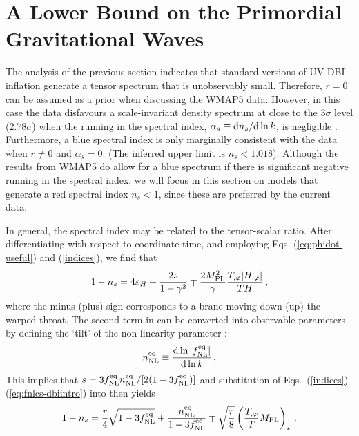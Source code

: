 \section{A Lower Bound on the Primordial Gravitational Waves} 
% 
\label{sec:lower-dbi}

The analysis of the previous section 
indicates that standard versions of UV DBI inflation generate a 
tensor spectrum that is unobservably 
small. Therefore, $r=0$ can be assumed as a prior when discussing the WMAP5
data.
However, in this case the data 
disfavours a scale-invariant density spectrum at close to the $3 \sigma$ level
($2.78\sigma$)
when the running in the spectral index, $\alpha_s \equiv \mathrm{d} n_s/\mathrm{d}\ln k$, 
is negligible \cite{Komatsu:2008hk}.  
Furthermore, a blue spectral index 
is only marginally consistent with the data when $r\ne 0$ and $\alpha_s=0$. 
(The inferred upper limit is $n_s < 1.018$).
Although the results from WMAP5 do allow for a blue spectrum if there is 
significant negative running in the spectral index, we will 
focus in this section 
on models that generate a red spectral index $n_s<1$, since these are preferred by the current
data.  


In general, the spectral index may be related to the tensor-scalar ratio. 
After differentiating  
with respect to coordinate time, and employing Eqs. (\ref{eq:phidot-useful}) 
and (\ref{indices}), we find that\footnotemark
% 
\begin{equation}
\label{eq:nsconstraint}
1-n_s = 4 \varepsilon_H +\frac{2s}{1-\gamma^2} \mp 
\frac{2M_{\mathrm{PL}}^2}{\gamma} \frac{T_{,\varphi}|H_{,\varphi}|}{TH}  \,,
\end{equation}
% 
where the minus (plus) sign corresponds to 
a brane moving down (up) the warped throat.
%  
% 
The second term in 
can be converted into observable parameters
by defining the `tilt' of the non-linearity parameter  \cite{brane14}: 
% 
\begin{equation}
\label{eq:nnl-defn-dbi}
n_{\mathrm{NL}}^{\mathrm{eq}} \equiv \frac{\mathrm{d} \ln |f_{\mathrm{NL}}^{\mathrm{eq}}|}{\mathrm{d}\ln k}\,. 
\end{equation}
% 
This implies that $s=  3 f_{\mathrm{NL}}^{\mathrm{eq}} n_{\mathrm{NL}}^{\mathrm{eq}} /[2(1-3f_{\mathrm{NL}}^{\mathrm{eq}})]$ and     
substitution of Eqs.~(\ref{indices})--(\ref{eq:fnlcs-dbiintro}) 
into  then yields
% 
\begin{equation}
\label{eq:obscon1}
1-n_s = \frac{r}{4} \sqrt{1-3f_{\mathrm{NL}}^{\mathrm{eq}}} + \frac{n_{\mathrm{NL}}^{\mathrm{eq}}}{1-3f_{\mathrm{NL}}^{\mathrm{eq}}}
\mp \sqrt{\frac{r}{8}} \left( \frac{T_{,\varphi}}{T} M_{\mathrm{PL}} \right)_*  \,.
\end{equation}
% 



